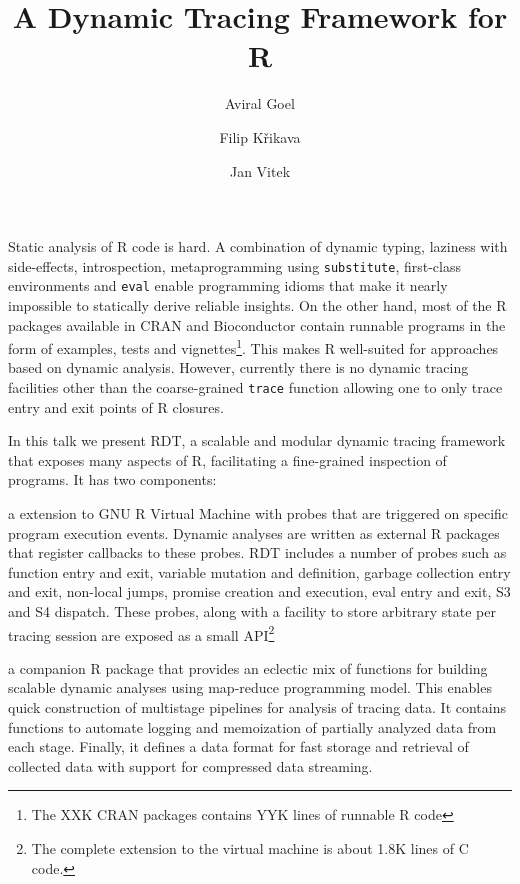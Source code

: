 \documentclass[acmsmall,review]{acmart}
\title{A Dynamic Tracing Framework for R}
\author{Aviral Goel}
\affiliation{
  \institution{Northeastern University}
  \country{USA}
}
\author{Filip Křikava}
\affiliation{
  \institution{Czech Technical University}
  \country{Czechia}
}
\author{Jan Vitek}
\affiliation{
  \institution{Northeastern University}
  \country{USA}
}
\affiliation{
  \institution{Czech Technical University}
  \country{Czechia}
}
\newcommand{\code}[1]{\lstinline|#1|\xspace}
\newcommand{\RDT}{RDT\xspace}
\begin{document}
\maketitle

Static analysis of R code is hard. A combination of dynamic typing, laziness
with side-effects, introspection, metaprogramming using \code{substitute},
first-class environments and \code{eval} enable programming idioms that make it
nearly impossible to statically derive reliable insights. On the other hand,
most of the R packages available in CRAN and Bioconductor contain runnable
programs in the form of examples, tests and vignettes\footnote{The XXK CRAN
  packages contains YYK lines of runnable R code}. This makes R well-suited for
approaches based on dynamic analysis.
%
However, currently there is no dynamic tracing facilities other than the
coarse-grained \code{trace} function allowing one to only trace entry and exit
points of R closures.

In this talk we present \RDT, a scalable and modular dynamic tracing framework
that exposes many aspects of R, facilitating a fine-grained inspection of
programs. It has two components:
%
\begin{compactitem}[$-$]
\item a extension to GNU R Virtual Machine with probes that are triggered on
  specific program execution events. Dynamic analyses are written as external R
  packages that register callbacks to these probes. \RDT includes a number of
  probes such as function entry and exit, variable mutation and definition,
  garbage collection entry and exit, non-local jumps, promise creation and
  execution, eval entry and exit, S3 and S4 dispatch. These probes, along with
  a facility to store arbitrary state per tracing session are exposed as a
  small API\footnote{The complete extension to the virtual machine is about 1.8K lines
    of C code.}
\item a companion R package that provides an eclectic mix of functions for
  building scalable dynamic analyses using map-reduce programming model. This
  enables quick construction of multistage pipelines for analysis of tracing
  data. It contains functions to automate logging and memoization of partially
  analyzed data from each stage. Finally, it defines a data format for fast
  storage and retrieval of collected data with support for compressed data
  streaming.
\end{compactitem}
\end{document}
